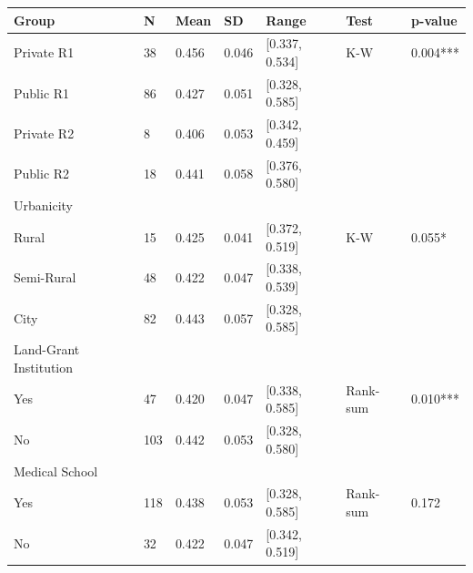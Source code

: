 \begin{tabular}{lllllll}
\toprule
Group & N & Mean & SD & Range & Test & p-value \\
\midrule
Private R1 & 38 & 0.456 & 0.046 & [0.337, 0.534] & K-W & 0.004*** \\
Public R1 & 86 & 0.427 & 0.051 & [0.328, 0.585] &  &  \\
Private R2 & 8 & 0.406 & 0.053 & [0.342, 0.459] &  &  \\
Public R2 & 18 & 0.441 & 0.058 & [0.376, 0.580] &  &  \\
Urbanicity &  &  &  &  &  &  \\
Rural & 15 & 0.425 & 0.041 & [0.372, 0.519] & K-W & 0.055* \\
Semi-Rural & 48 & 0.422 & 0.047 & [0.338, 0.539] &  &  \\
City & 82 & 0.443 & 0.057 & [0.328, 0.585] &  &  \\
Land-Grant Institution &  &  &  &  &  &  \\
Yes & 47 & 0.420 & 0.047 & [0.338, 0.585] & Rank-sum & 0.010*** \\
No & 103 & 0.442 & 0.053 & [0.328, 0.580] &  &  \\
Medical School &  &  &  &  &  &  \\
Yes & 118 & 0.438 & 0.053 & [0.328, 0.585] & Rank-sum & 0.172 \\
No & 32 & 0.422 & 0.047 & [0.342, 0.519] &  &  \\
\bottomrule
\end{tabular}
